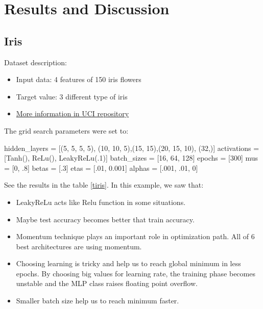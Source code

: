 \documentclass[10pt]{SelfArx} %
\begin{document}
\section{Results and Discussion}

\subsection{Iris}
Dataset description:
\begin{itemize}
	\item Input data: 4 features of 150 iris flowers
	
	\item Target value: 3 different type of iris	
	
	\item \href{https://archive.ics.uci.edu/ml/datasets/Iris}{More information in UCI repository}
\end{itemize}
The grid search parameters were set to:
\begin{python}
hidden_layers = [(5, 5, 5, 5),
(10, 10, 5),(15, 15),(20, 15, 10),
       (32,)]
activations = [Tanh(), ReLu(),
                LeakyReLu(.1)]
batch_sizes = [16, 64, 128]
epochs = [300]
mus = [0, .8]
betas = [.3]
etas = [.01, 0.001]
alphas = [.001, .01, 0]
\end{python}
See the results in the table \ref{tiris}. In this example, we saw that:
\begin{itemize}
\item  LeakyReLu acts like Relu function in some situations.
\item  Maybe test accuracy becomes better that train accuracy.
\item  Momentum technique plays an important role in optimization path. All of 6 best architectures are using momentum.
\item  Choosing learning is tricky and help us to reach global minimum in less epochs. By choosing big values for learning rate, the training phase becomes unstable and the MLP class raises floating point overflow.
\item  Smaller batch size help us to reach minimum faster.
\end{itemize}
\end{document}
